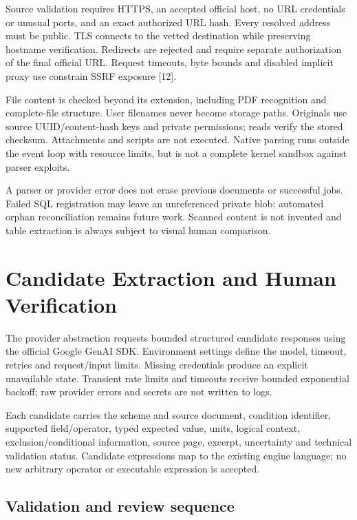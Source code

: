 \documentclass[12pt,a4paper,twoside]{report}
\begin{document}
Source validation requires HTTPS, an accepted official host, no URL credentials or unusual ports, and an exact authorized URL hash. Every resolved address must be public. TLS connects to the vetted destination while preserving hostname verification. Redirects are rejected and require separate authorization of the final official URL. Request timeouts, byte bounds and disabled implicit proxy use constrain SSRF exposure [12].

File content is checked beyond its extension, including PDF recognition and complete-file structure. User filenames never become storage paths. Originals use source UUID/content-hash keys and private permissions; reads verify the stored checksum. Attachments and scripts are not executed. Native parsing runs outside the event loop with resource limits, but is not a complete kernel sandbox against parser exploits.

A parser or provider error does not erase previous documents or successful jobs. Failed SQL registration may leave an unreferenced private blob; automated orphan reconciliation remains future work. Scanned content is not invented and table extraction is always subject to visual human comparison.

\section{Candidate Extraction and Human Verification}

The provider abstraction requests bounded structured candidate responses using the official Google GenAI SDK. Environment settings define the model, timeout, retries and request/input limits. Missing credentials produce an explicit unavailable state. Transient rate limits and timeouts receive bounded exponential backoff; raw provider errors and secrets are not written to logs.

Each candidate carries the scheme and source document, condition identifier, supported field/operator, typed expected value, units, logical context, exclusion/conditional information, source page, excerpt, uncertainty and technical validation status. Candidate expressions map to the existing engine language; no new arbitrary operator or executable expression is accepted.

\subsection*{Validation and review sequence}
\end{document}
